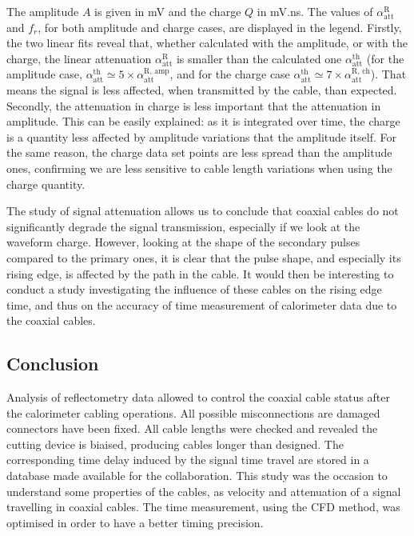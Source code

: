 The amplitude $A$ is given in mV and the charge $Q$ in mV.ns.
The values of $\alpha_{\text{att}}^{\text{R}}$ and $f_{r}$, for both amplitude and charge cases, are displayed in the legend.
Firstly, the two linear fits reveal that, whether calculated with the amplitude, or with the charge, the linear attenuation $\alpha_{\text{att}}^{\text{R}}$ is smaller than the calculated one $\alpha_{\text{att}}^{\text{th}}$ (for the amplitude case, $\alpha_{\text{att}}^{\text{th}}\simeq 5\times \alpha_{\text{att}}^{\text{R, amp}}$, and for the charge case $\alpha_{\text{att}}^{\text{th}}\simeq 7\times \alpha_{\text{att}}^{\text{R, ch}}$).
That means the signal is less affected, when transmitted by the cable, than expected.
Secondly, the attenuation in charge is less important that the attenuation in amplitude.
This can be easily explained: as it is integrated over time, the charge is a quantity less affected by amplitude variations that the amplitude itself.
For the same reason, the charge data set points are less spread than the amplitude ones, confirming we are less sensitive to cable length variations when using the charge quantity.

The study of signal attenuation allows us to conclude that coaxial cables do not significantly degrade the signal transmission, especially if we look at the waveform charge.
However, looking at the shape of the secondary pulses compared to the primary ones, it is clear that the pulse shape, and especially its rising edge, is affected by the path in the cable.
It would then be interesting to conduct a study investigating the influence of these cables on the rising edge time, and thus on the accuracy of time measurement of calorimeter data due to the coaxial cables.

\subsection{Conclusion}

Analysis of reflectometry data allowed to control the coaxial cable status after the calorimeter cabling operations.
All possible misconnections are damaged connectors have been fixed.
All cable lengths were checked and revealed the cutting device is biaised, producing cables longer than designed.
The corresponding time delay induced by the signal time travel are stored in a database made available for the collaboration.
This study was the occasion to understand some properties of the cables, as velocity and attenuation of a signal travelling in coaxial cables.
The time measurement, using the CFD method, was optimised in order to have a better timing precision.


